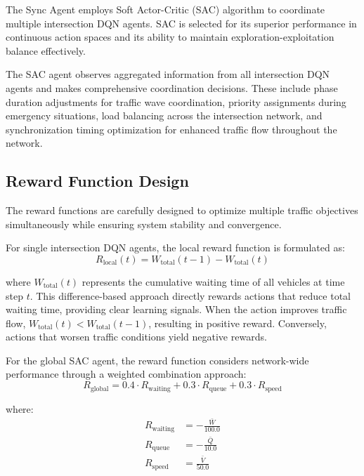 The Sync Agent employs Soft Actor-Critic (SAC) algorithm to coordinate multiple intersection DQN agents. 
SAC is selected for its superior performance in continuous action spaces and its ability to maintain 
exploration-exploitation balance effectively.

The SAC agent observes aggregated information from all intersection DQN agents and makes comprehensive 
coordination decisions. These include phase duration adjustments for traffic wave coordination, priority 
assignments during emergency situations, load balancing across the intersection network, and 
synchronization timing optimization for enhanced traffic flow throughout the network.

\subsection{Reward Function Design}\label{subsec2a-4}

The reward functions are carefully designed to optimize multiple traffic objectives simultaneously while 
ensuring system stability and convergence.

For single intersection DQN agents, the local reward function is formulated as:
\begin{equation}
R_{\text{local}}(t) = W_{\text{total}}(t-1) - W_{\text{total}}(t)
\end{equation}

where $W_{\text{total}}(t)$ represents the cumulative waiting time of all vehicles at time step $t$. 
This difference-based approach directly rewards actions that reduce total waiting time, providing clear 
learning signals. When the action improves traffic flow, $W_{\text{total}}(t) < W_{\text{total}}(t-1)$, 
resulting in positive reward. Conversely, actions that worsen traffic conditions yield negative rewards.

For the global SAC agent, the reward function considers network-wide performance through a weighted 
combination approach:
\begin{equation}
R_{\text{global}} = 0.4 \cdot R_{\text{waiting}} + 0.3 \cdot R_{\text{queue}} + 0.3 \cdot R_{\text{speed}}
\end{equation}

where:
\begin{align}
R_{\text{waiting}} &= -\frac{\bar{W}}{100.0} \\
R_{\text{queue}} &= -\frac{\bar{Q}}{10.0} \\
R_{\text{speed}} &= \frac{\bar{V}}{50.0}
\end{align}

